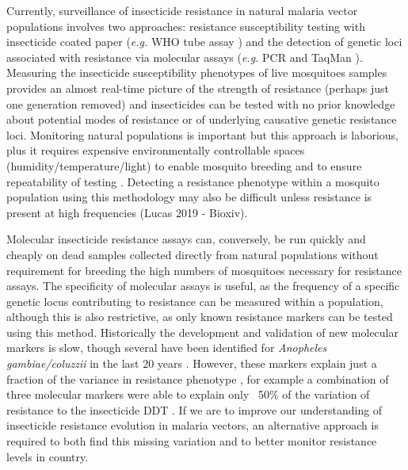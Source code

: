 \documentclass[a4paper,11pt,abstracton,hidelinks]{scrartcl}
\begin{document}
Currently, surveillance of insecticide resistance in natural malaria vector populations involves two approaches:
%
resistance susceptibility testing with insecticide coated paper (\textit{e.g.} WHO tube assay \cite{world2016test}) and the detection of genetic loci associated with resistance via molecular assays (\textit{e.g.} PCR \cite{Ranson2000} and TaqMan \cite{bass2007}).
%
Measuring the insecticide susceptibility phenotypes of live mosquitoes samples provides an almost real-time picture of the strength of resistance (perhaps just one generation removed) and insecticides can be tested with no prior knowledge about potential modes of resistance or of underlying causative genetic resistance loci.
%
Monitoring natural populations is important but this approach is laborious, plus it requires expensive environmentally controllable spaces (humidity/temperature/light) to enable mosquito breeding and to ensure repeatability of testing \cite{kleinschmidt2018}.
%
Detecting a resistance phenotype within a mosquito population using this methodology may also be difficult unless resistance is present at high frequencies (Lucas 2019 - Bioxiv).


Molecular insecticide resistance assays can, conversely, be run quickly and cheaply on dead samples collected directly from natural populations without requirement for breeding the high numbers of mosquitoes necessary for resistance assays.
%
The specificity of molecular assays is useful, as the frequency of a specific genetic locus contributing to resistance can be measured within a population, although this is also restrictive, as only known resistance markers can be tested using this method.
%
Historically the development and validation of new molecular markers is slow, though several have been identified for \textit{Anopheles gambiae/coluzzii} in the last 20 years \cite{du2005, jones2012, martinez1998, mitchell2014, ranson2000, riveron2014, weetman2018, weill2003}.
%
However, these markers explain just a fraction of the variance in resistance phenotype \cite{donnelly2009, donnelly2016}, for example a combination of three molecular markers were able to explain only ~50\% of the variation of resistance to the insecticide DDT \cite{mitchell2014}.
%
If we are to improve our understanding of insecticide resistance evolution in malaria vectors, an alternative approach is required to both find this missing variation and to better monitor resistance levels in country. 
\end{document}
